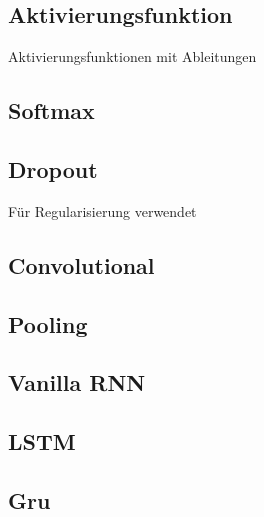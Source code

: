 \documentclass[12pt]{article}
\begin{document}
	\subsection{Aktivierungsfunktion}
	Aktivierungsfunktionen mit Ableitungen
	\subsection{Softmax}
	\subsection{Dropout}
	Für Regularisierung verwendet
	\subsection{Convolutional}
	\subsection{Pooling}
	\subsection{Vanilla RNN}
	\subsection{LSTM}
	\subsection{Gru}
\end{document}
